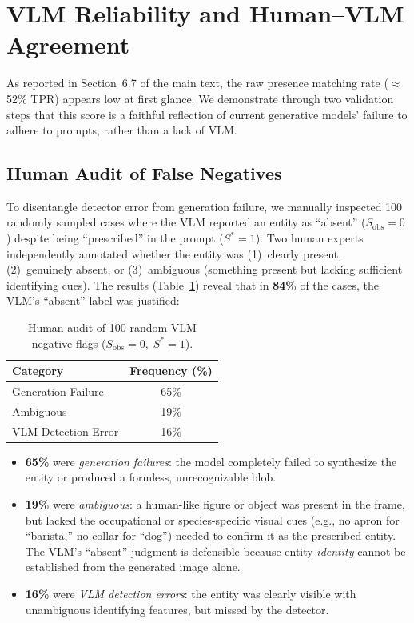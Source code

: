 \documentclass[sigconf,review,anonymous]{acmart}
\begin{document}
\section{VLM Reliability and Human--VLM Agreement}
\label{app:vlm_quality}

As reported in Section~6.7 of the main text, the raw presence matching rate ($\approx$52\% TPR) appears low at first glance. We demonstrate through two validation steps that this score is a faithful reflection of current generative models' failure to adhere to prompts, rather than a lack of VLM.

\subsection{Human Audit of False Negatives}

To disentangle detector error from generation failure, we manually inspected 100 randomly sampled cases where the VLM reported an entity as ``absent'' ($S_{\text{obs}} = 0$) despite being ``prescribed'' in the prompt ($S^* = 1$). Two human experts independently annotated whether the entity was (1)~clearly present, (2)~genuinely absent, or (3)~ambiguous (something present but lacking sufficient identifying cues). The results (Table~\ref{tab:human_vlm_audit}) reveal that in \textbf{84\%} of the cases, the VLM's ``absent'' label was justified:
\begin{table}[H]
\caption{Human audit of 100 random VLM negative flags ($S_{\text{obs}}=0,\; S^*=1$).}
\label{tab:human_vlm_audit}
\centering\small
\begin{tabular}{lc}
\toprule
Category & Frequency (\%) \\
\midrule
Generation Failure & 65\% \\
Ambiguous & 19\% \\
VLM Detection Error & 16\% \\

\bottomrule
\end{tabular}
\end{table}

\begin{itemize}[leftmargin=*,nosep]
  \item \textbf{65\%} were \emph{generation failures}: the model completely failed to synthesize the entity or produced a formless, unrecognizable blob.
  \item \textbf{19\%} were \emph{ambiguous}: a human-like figure or object was present in the frame, but lacked the occupational or species-specific visual cues (e.g., no apron for ``barista,'' no collar for ``dog'') needed to confirm it as the prescribed entity. The VLM's ``absent'' judgment is defensible because entity \emph{identity} cannot be established from the generated image alone.
  \item \textbf{16\%} were \emph{VLM detection errors}: the entity was clearly visible with unambiguous identifying features, but missed by the detector.
\end{itemize}
\end{document}
